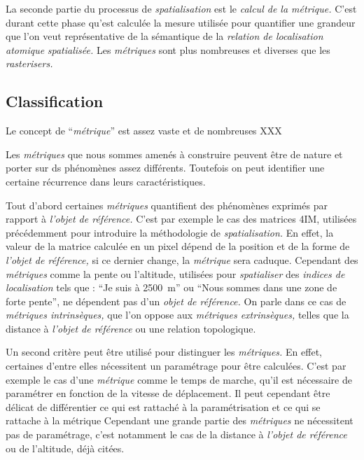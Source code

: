 La seconde partie du processus de \emph{spatialisation} est le
\emph{calcul de la métrique.} C'est durant cette phase qu'est calculée
la mesure utilisée pour quantifier une grandeur que l'on veut
représentative de la sémantique de la \emph{relation de localisation
  atomique} \emph{spatialisée.} Les \emph{métriques} sont plus
nombreuses et diverses que les \emph{rasterisers.}

\subsection{Classification}

Le concept de \enquote{\emph{métrique}} est assez vaste et de
nombreuses XXX 

Les \emph{métriques} que nous sommes amenés à construire peuvent être
de nature et porter sur ds phénomènes assez différents. Toutefois on
peut identifier une certaine récurrence dans leurs
caractéristiques.

Tout d'abord certaines \emph{métriques} quantifient des phénomènes
exprimés par rapport à \emph{l'objet de référence.}  C'est par exemple
le cas des matrices 4IM, utilisées précédemment pour introduire la
méthodologie de \emph{spatialisation.} En effet, la valeur de la
matrice calculée en un pixel dépend de la position et de la forme de
\emph{l'objet de référence,} si ce dernier change, la \emph{métrique}
sera caduque. Cependant des \emph{métriques} comme la pente ou
l'altitude, utilisées pour \emph{spatialiser} des \emph{indices de
  localisation} tels que : \enquote{Je suis à \SI{2500}{\meter}} ou
\enquote{Nous sommes dans une zone de forte pente}, ne dépendent pas
d'un \emph{objet de référence.} On parle dans ce cas de
\emph{métriques intrinsèques,} que l'on oppose aux \emph{métriques
  extrinsèques,} telles que la distance à \emph{l'objet de référence}
ou une relation topologique.

Un second critère peut être utilisé pour distinguer les
\emph{métriques.} En effet, certaines d'entre elles nécessitent un
paramétrage pour être calculées. C'est par exemple le cas d'une
\emph{métrique} comme le temps de marche, qu'il est nécessaire de
paramétrer en fonction de la vitesse de déplacement.
%
Il peut cependant être délicat de différentier ce qui est rattaché à
la paramétrisation et ce qui se rattache à la métrique
%
Cependant une
grande partie des \emph{métriques} ne nécessitent pas de paramétrage,
c'est notamment le cas de la distance à \emph{l'objet de référence} ou
de l'altitude, déjà citées.


